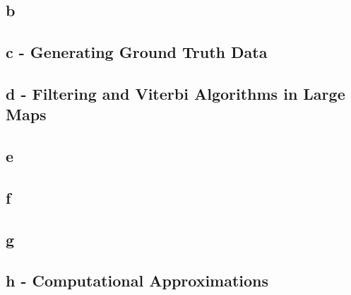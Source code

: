 \documentclass[11pt, oneside]{article}   	%
\begin{document}
\begin{flushleft}
\subsection*{b}
\subsection*{c - Generating Ground Truth Data}
\subsection*{d - Filtering and Viterbi Algorithms in Large Maps}
\subsection*{e}
\subsection*{f}
\subsection*{g}
\subsection*{h - Computational Approximations}
\end{flushleft}
\end{document}
